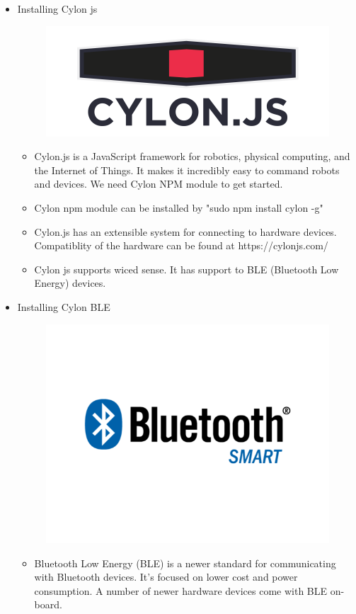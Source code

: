 \documentclass[11pt,a4paper]{article}
\begin{document}
\begin{itemize}
	\newpage
	\item Installing Cylon js
		 \begin{figure}[h]
    \centering
	\includegraphics[scale=0.3]{CylonJS.png}
	\end{figure}
    \begin{itemize}
\item 	Cylon.js is a JavaScript framework for robotics, physical computing, and the Internet of Things. It makes it incredibly easy to command robots and devices.
	We need Cylon NPM module to get started. 
	\item Cylon npm module can be installed by "sudo npm install cylon -g"
	\item Cylon.js has an extensible system for connecting to hardware devices. Compatiblity of the hardware can be found at https://cylonjs.com/
	\item Cylon js supports wiced sense. It has support to BLE (Bluetooth Low Energy) devices.
	\end{itemize}
	
	\item Installing Cylon BLE
	\begin{figure}[h]
    \centering
	\includegraphics[scale=0.3]{bluetooth-smart.png}
	\end{figure}
	    \begin{itemize}  
	    \item Bluetooth Low Energy (BLE) is a newer standard for communicating with Bluetooth devices. It's focused on lower cost and power consumption. A number of newer hardware devices come with BLE on-board.


\end{itemize}
\end{itemize}
\end{document}
